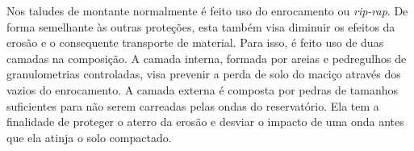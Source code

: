 \item Nos taludes de montante normalmente é feito uso do enrocamento ou \textit{rip-rap}. De forma semelhante às outras proteções, esta também visa diminuir os efeitos da erosão e o consequente transporte de material. Para isso, é feito uso de duas camadas na composição. A camada interna, formada por areias e pedregulhos de granulometrias controladas, visa prevenir a perda de solo do maciço através dos vazios do enrocamento. A camada externa é composta por pedras de tamanhos suficientes para não serem carreadas pelas ondas do reservatório. Ela tem a finalidade de proteger o aterro da erosão e desviar o impacto de uma onda antes que ela atinja o solo compactado.